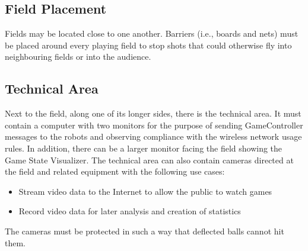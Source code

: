 \subsection{Field Placement}
Fields may be located close to one another. 
Barriers (i.e., boards and nets) must be placed around every playing field to stop shots that could otherwise fly into neighbouring fields or into the audience.


\subsection{Technical Area}
Next to the field, along one of its longer sides, there is the technical area. It must contain a computer
with two monitors for the purpose of sending GameController messages to the robots and observing
compliance with the wireless network usage rules. In addition, there can be a larger monitor facing
the field showing the Game State Visualizer.
The technical area can also contain cameras directed at the field and related equipment with the
following use cases:
\begin{itemize}
    \item Stream video data to the Internet to allow the public to watch games
    \item Record video data for later analysis and creation of statistics
\end{itemize}
The cameras must be protected in such a way that deflected balls cannot hit them.


